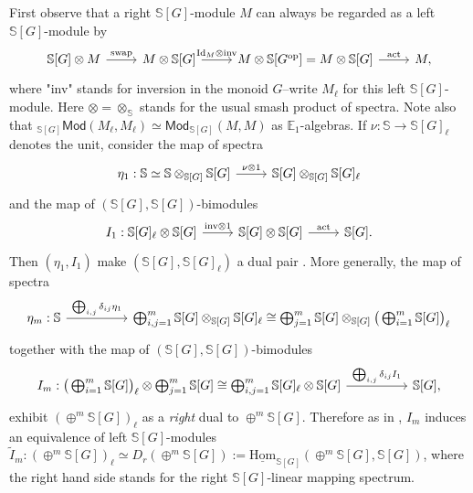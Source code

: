 \documentclass[a4paper, oneside]{amsart}
\newcommand{\Id}{\mathrm{Id}}
\newcommand{\1}{\mathds{1}}
\theoremstyle{remark}
\theoremstyle{definition}
\newcommand{\s}{\mathbb{S}}
\numberwithin{equation}{section}
\begin{document}
First observe that a right $\s[G]$-module $M$ can always be regarded as a left $\s[G]$-module by
\[
\begin{tikzcd}
    \s[G]\otimes M\rar["\text{swap}"] & M\otimes \s[G]\rar["\Id_M\otimes \text{inv}"] & M\otimes \s[G^{\mathrm{op}}]=M\otimes \s[G]\rar["\mathrm{act}"] & M,
\end{tikzcd}
\]
where "inv" stands for inversion in the monoid $G$--write $M_\ell$ for this left $\s[G]$-module. Here $\otimes=\otimes_\s$ stands for the usual smash product of spectra. Note also that $_{\s[G]}\mathsf{Mod}(M_\ell,M_\ell)\simeq \mathsf{Mod}_{\s[G]}(M,M)$ as $\mathbb{E}_1$-algebras. If $\nu: \s\to \s[G]_\ell$ denotes the unit, consider the map of spectra
$$
\begin{tikzcd}
\eta_1: \s\simeq \s\otimes_{\s[G]}\s[G]\rar["\nu\otimes1"] & \s[G]\otimes_{\s[G]}\s[G]_\ell
\end{tikzcd}
$$
and the map of $(\s[G],\s[G])$-bimodules
{\[
\begin{tikzcd}
I_1: \s[G]_\ell\otimes \s[G]\rar["\text{inv}\otimes 1"]&\s[G]\otimes \s[G]\rar["\text{act}"] &\s[G].
\end{tikzcd}
\]}
Then $(\eta_1,I_1)$ make $(\s[G], \s[G]_\ell)$ a dual pair \cite[Defn. 16.4.1]{MaySigurdsson}. More generally, the map of spectra
$$
\begin{tikzcd}
\eta_m:\s \ar[rr,"\bigoplus_{i,j}\delta_{ij}\eta_1"]&&\bigoplus_{i,j=1}^m \s[G]\otimes_{\s[G]}\s[G]_\ell\cong \bigoplus^m_{j=1}\s[G] \otimes_{\s[G]}\big(\bigoplus^m_{i=1}\s[G]\big)_\ell
\end{tikzcd}
$$
together with the map of $(\s[G],\s[G])$-bimodules
$$
\begin{tikzcd}
I_m: \big(\bigoplus^m_{i=1}\s[G]\big)_\ell \otimes\bigoplus^m_{j=1}\s[G]\cong \bigoplus_{i,j=1}^m \s[G]_\ell\otimes \s[G]\ar[rr,"\bigoplus_{i,j}\delta_{ij}I_1"] & &\s[G],
\end{tikzcd}
$$
exhibit $(\oplus^m\s[G])_\ell$ as a \textit{right} dual to $\oplus^m\s[G]$. Therefore as in \cite[Prop. 16.4.9]{MaySigurdsson}, $I_m$ induces an equivalence of left $\s[G]$-modules $\widetilde{I}_m: (\oplus^m\s[G])_\ell\simeq D_r(\oplus^m\s[G]):=\underline{\mathrm{Hom}}_{\s[G]}(\oplus^m\s[G],\s[G])$, where the right hand side stands for the right $\s[G]$-linear mapping spectrum. 
\end{document}

